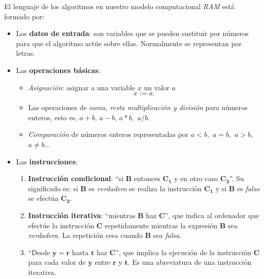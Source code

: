 \documentclass[twoside]{report}
\newcommand{\bs}[1]{\boldsymbol{#1}}
\begin{document}
El lenguaje de los algoritmos en nuestro modelo computacional \emph{RAM} está formado por:
 \begin{itemize}
   \item Los \textbf{datos de entrada}: son variables que se pueden sustituir por números para que el algoritmo actúe sobre ellas. Normalmente se representan por letras.
   \item Las \textbf{operaciones básicas}:
    \begin{itemize}
      \item \emph{Asignación}: asignar a una variable $x$ un valor $a$ $$x:=a.$$
      \item Las operaciones de \emph{suma, resta multiplicación y división} para números enteros, esto es, $a+b$, $a-b$,
            $a*b,$ $a/b.$
      \item \emph{Comparación} de números enteros representadas por $a<b,$ $a=b,$ $a>b,$ $a\neq b$...
    \end{itemize}
   \item Las \textbf{instrucciones}:
      \begin{enumerate}
        \item \textbf{Instrucción condicional}: ``\textsf{si} $\bs{B}$ \textsf{entonces} $\bs{C_1}$ \textsf{y en otro caso} $\bs{C_2}$''. Su significado es: si $\bs{B}$ es \emph{verdadero} se realiza la instrucción $\bs{C_1}$ y si $\bs{B}$ es \emph{falso} se efectúa $\bs{C_2}$.
        \item \textbf{Instrucción iterativa}: ``\textsf{mientras} $\bs{B}$ \textsf{haz}  $\bs{C}$'', que indica al ordenador que efectúe la instrucción $\bs{C}$ repetidamente mientras la expresión $\bs{B}$ sea \emph{verdadera}. La repetición cesa cuando $\bs{B}$ sea \emph{falsa}.
        \item ``\textsf{Desde} $\bs{y=r}$ \textsf{hasta} $\bs{t}$ \textsf{haz} $\bs{C}$'', que implica la ejecución de la ins\-truc\-ción $\bs{C}$ para cada valor de $\bs{y}$ entre $\bs{r}$ y $\bs{t}$. Es una abreviatura de una instrucción iterativa.
      \end{enumerate}
 \end{itemize}
\end{document}
